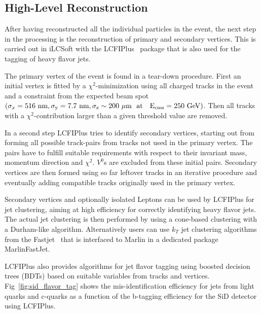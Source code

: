   

\subsection{\label{sub:sw-HLR}High-Level Reconstruction}

After having reconstructed all the individual particles in the event, the next step in the processing is the reconstruction of
primary and secondary vertices. This is carried out in iLCSoft with the LCFIPlus~\cite{Suehara:2015ura} package that is also used
for the tagging of heavy flavor jets.

The primary vertex of the event is found in a tear-down procedure. First an initial vertex is fitted by a $\chi^2$-minimization using
all charged tracks in the event and a constraint from the expected beam spot
$(\sigma_x=516~\rm{nm}, \sigma_y=7.7~\rm{nm},\sigma_z \sim 200~\mu\rm{m}~~\rm{at}~~~E_{cms}=250~\rm{GeV})$.
Then all tracks with a $\chi^2$-contribution larger than a given threshold value are removed.

In a second step LCFIPlus tries to identify secondary vertices, starting out from forming all possible track-pairs from tracks not
used in the primary vertex. The pairs have to fulfill suitable requirements with respect to their invariant mass, momentum direction
and $\chi^2$. $V^0$s are excluded from these initial pairs. Secondary vertices are then formed using so far leftover tracks in
an iterative procedure and eventually adding compatible tracks originally used in the primary vertex.

Secondary vertices and optionally isolated Leptons can be used by LCFIPlus for jet clustering, aiming at high efficiency for correctly identifying
heavy flavor jets. The actual jet clustering is then performed by using a cone-based clustering with a Durham-like algorithm.
Alternatively users can use $k_T$ jet clustering algorithms from the Fastjet~\cite{Cacciari:2006sm} that is interfaced to Marlin in a dedicated
package MarlinFastJet.

LCFIPlus also provides algorithms for jet flavor tagging using boosted decision trees (BDTs) based on suitable variables from tracks and vertices.
Fig~\ref{fig:sid_flavor_tag} shows the mis-identification efficiency for jets from light quarks and c-quarks as a function of the b-tagging efficiency
for the SiD detector using LCFIPlus.

